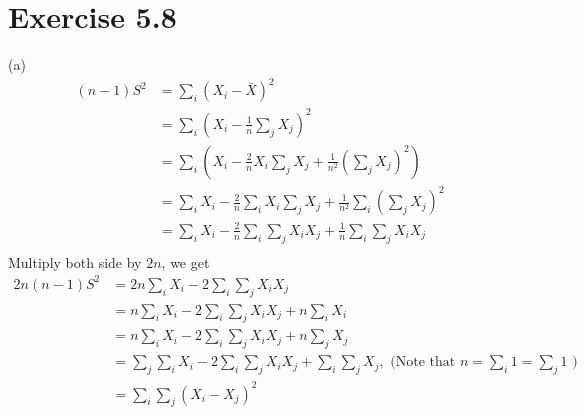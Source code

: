 \documentclass[12pt]{article}
\begin{document}
\section*{Exercise 5.8}
(a) $$
\begin{aligned}
	(n-1)S^2 &= \sum_i (X_i - \bar{X})^2 \\
	    &= \sum_i \left(X_i - \frac{1}{n} \sum_j X_j\right)^2 \\
	    &= \sum_i \left(X_i - \frac{2}{n} X_i \sum_j X_j + \frac{1}{n^2} \left(\sum_j X_j\right)^2 \right) \\
	    &= \sum_i X_i - \frac{2}{n} \sum_i X_i \sum_j X_j + \frac{1}{n^2} \sum_i \left(\sum_j X_j\right)^2 \\
	    &= \sum_i X_i - \frac{2}{n} \sum_i \sum_j X_i X_j + \frac{1}{n} \sum_i \sum_j X_i X_j \\
\end{aligned}
$$
Multiply both side by $2n$, we get 
$$
\begin{aligned}
	2n(n-1)S^2 &= 2n \sum_i X_i - 2 \sum_i \sum_j X_i X_j \\
	&= n \sum_i X_i - 2 \sum_i \sum_j X_i X_j + n \sum_i X_i \\
	&= n \sum_i X_i - 2 \sum_i \sum_j X_i X_j + n \sum_j X_j \\
	&= \sum_j \sum_i X_i - 2 \sum_i \sum_j X_i X_j + \sum_i \sum_j X_j , \mbox{ (Note that } n=\sum_i 1=\sum_j 1 \mbox{ )} \\
	&=  \sum_i \sum_j (X_i - X_j)^2 \\
\end{aligned}
$$
\end{document}
